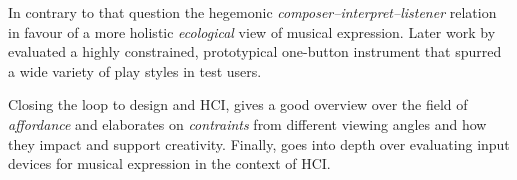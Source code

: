\documentclass[10pt,a4paper]{scrartcl}
\begin{document}
In contrary to that \cite{Gurevich2007} question the hegemonic \emph{composer--interpret--listener} relation in favour of a more holistic \emph{ecological} view of musical expression. Later work by \cite{Gurevich2010} evaluated a highly constrained, prototypical one-button instrument that spurred a wide variety of play styles in test users.

Closing the loop to design and HCI, \cite{Magnusson2010} gives a good overview over the field of \emph{affordance} and elaborates on \emph{contraints} from different viewing angles and how they impact and support creativity. Finally, \cite{Wanderley2002} goes into depth over evaluating input devices for musical expression in the context of HCI. 














\end{document}
